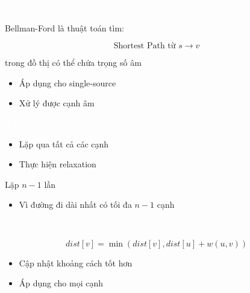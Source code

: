 \documentclass{beamer}
\title{\hlred{Bellman-Ford Algorithm}}
\author{Group 3}
\date{\hlcyan{03/2026}}
\newcommand{\hlblue}[1]{\textcolor{myblue}{#1}}
\newcommand{\hlgreen}[1]{\textcolor{mygreen}{#1}}
\newcommand{\hlred}[1]{\textcolor{myred}{#1}}
\newcommand{\hlpurple}[1]{\textcolor{mypurple}{#1}}
\newcommand{\hlwhite}[1]{\textcolor{white}{#1}}
\begin{document}
\frame{\titlepage}


\begin{frame}{\hlwhite{Định nghĩa}}
\begin{tcolorbox}[title=\textbf{\hlwhite{Khái niệm}}]
\hlblue{Bellman-Ford} là thuật toán tìm:

\[
\text{Shortest Path từ } s \rightarrow v
\]

trong đồ thị có thể chứa \hlred{trọng số âm}
\end{tcolorbox}

\begin{itemize}
\item Áp dụng cho \hlgreen{single-source}
\item Xử lý được cạnh âm
\end{itemize}
\end{frame}


\begin{frame}{\hlwhite{Ý tưởng}}
\begin{itemize}
\item Lặp qua tất cả các cạnh
\item Thực hiện \hlblue{relaxation}
\end{itemize}

\begin{tcolorbox}
\centering
\hlpurple{Lặp $n-1$ lần}
\end{tcolorbox}

\begin{itemize}
\item Vì đường đi dài nhất có tối đa $n-1$ cạnh
\end{itemize}
\end{frame}


\begin{frame}{\hlwhite{Relaxation}}
\begin{tcolorbox}
\centering
\[
dist[v] = \min(dist[v], dist[u] + w(u,v))
\]
\end{tcolorbox}

\begin{itemize}
\item Cập nhật khoảng cách tốt hơn
\item Áp dụng cho mọi cạnh
\end{itemize}
\end{frame}
\end{document}
